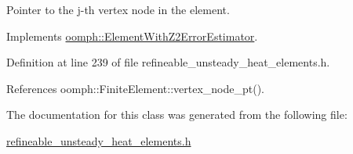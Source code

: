 Pointer to the j-\/th vertex node in the element. 



Implements \hyperlink{classoomph_1_1ElementWithZ2ErrorEstimator_a0eedccc33519f852c5dc2055ddf2774b}{oomph\+::\+Element\+With\+Z2\+Error\+Estimator}.



Definition at line 239 of file refineable\+\_\+unsteady\+\_\+heat\+\_\+elements.\+h.



References oomph\+::\+Finite\+Element\+::vertex\+\_\+node\+\_\+pt().



The documentation for this class was generated from the following file\+:\begin{DoxyCompactItemize}
\item 
\hyperlink{refineable__unsteady__heat__elements_8h}{refineable\+\_\+unsteady\+\_\+heat\+\_\+elements.\+h}\end{DoxyCompactItemize}

